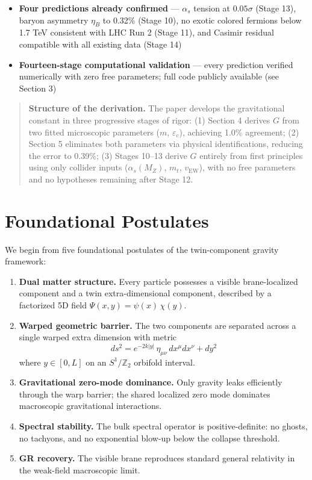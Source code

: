 \documentclass[
  11pt,
]{article}
\begin{document}
\begin{itemize}
  vector-like generation would shift \(G\) by \(-99.5\%\), making this
  framework more sensitive than direct collider searches
\item
  \textbf{Four predictions already confirmed} --- \(\alpha_s\) tension
  at \(0.05\sigma\) (Stage 13), baryon asymmetry \(\eta_B\) to 0.32\%
  (Stage 10), no exotic colored fermions below 1.7 TeV consistent with
  LHC Run 2 (Stage 11), and Casimir residual compatible with all
  existing data (Stage 14)
\item
  \textbf{Fourteen-stage computational validation} --- every prediction
  verified numerically with zero free parameters; full code publicly
  available (see Section 3)
\end{itemize}

\begin{quote}
\textbf{Structure of the derivation.} The paper develops the
gravitational constant in three progressive stages of rigor: (1) Section
4 derives \(G\) from two fitted microscopic parameters (\(m\),
\(\varepsilon_c\)), achieving 1.0\% agreement; (2) Section 5 eliminates
both parameters via physical identifications, reducing the error to
0.39\%; (3) Stages 10--13 derive \(G\) entirely from first principles
using only collider inputs (\(\alpha_s(M_Z)\), \(m_t\),
\(v_{\text{EW}}\)), with no free parameters and no hypotheses remaining
after Stage 12.
\end{quote}

\bigskip

\section{Foundational Postulates}\label{sec:foundational-postulates}

We begin from five foundational postulates of the twin-component gravity
framework:

\begin{enumerate}
\def\labelenumi{\arabic{enumi}.}
\item
  \textbf{Dual matter structure.} Every particle possesses a visible
  brane-localized component and a twin extra-dimensional component,
  described by a factorized 5D field \(\Psi(x,y) = \psi(x)\,\chi(y)\).
\item
  \textbf{Warped geometric barrier.} The two components are separated
  across a single warped extra dimension with metric
  \[ds^2 = e^{-2k|y|}\,\eta_{\mu\nu}\,dx^\mu dx^\nu + dy^2 \tag{1}\]
  where \(y \in [0, L]\) on an \(S^1/\mathbb{Z}_2\) orbifold interval.
\item
  \textbf{Gravitational zero-mode dominance.} Only gravity leaks
  efficiently through the warp barrier; the shared localized zero mode
  dominates macroscopic gravitational interactions.
\item
  \textbf{Spectral stability.} The bulk spectral operator is
  positive-definite: no ghosts, no tachyons, and no exponential blow-up
  below the collapse threshold.
\item
  \textbf{GR recovery.} The visible brane reproduces standard general
  relativity in the weak-field macroscopic limit.
\end{enumerate}
\end{document}
